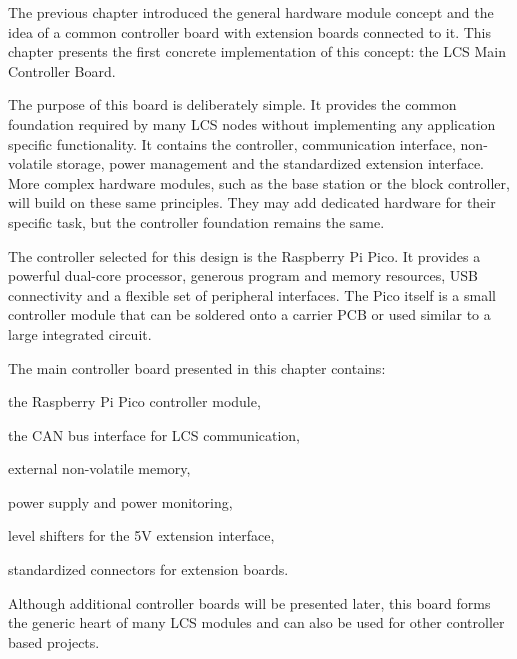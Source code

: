 %

The previous chapter introduced the general hardware module concept and the
idea of a common controller board with extension boards connected to it.
This chapter presents the first concrete implementation of this concept: the
LCS Main Controller Board.

The purpose of this board is deliberately simple. It provides the common
foundation required by many LCS nodes without implementing any application
specific functionality. It contains the controller, communication interface,
non-volatile storage, power management and the standardized extension
interface.
More complex hardware modules, such as the base station or the block
controller, will build on these same principles. They may add dedicated
hardware for their specific task, but the controller foundation remains the
same.

The controller selected for this design is the Raspberry Pi Pico. It provides
a powerful dual-core processor, generous program and memory resources, USB
connectivity and a flexible set of peripheral interfaces. The Pico itself is
a small controller module that can be soldered onto a carrier PCB or used
similar to a large integrated circuit.

The main controller board presented in this chapter contains:

\begin{smallGapItemize}
\item the Raspberry Pi Pico controller module,
\item the CAN bus interface for LCS communication,
\item external non-volatile memory,
\item power supply and power monitoring,
\item level shifters for the 5V extension interface,
\item standardized connectors for extension boards.
\end{smallGapItemize}

Although additional controller boards will be presented later, this board
forms the generic heart of many LCS modules and can also be used for other
controller based projects.


